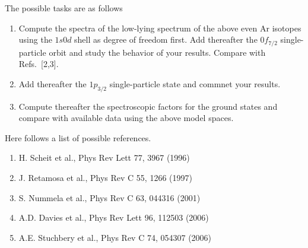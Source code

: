 \documentclass[prc]{revtex4}
\begin{document}
The possible tasks are as follows
\begin{enumerate}
\item Compute the spectra  of the low-lying spectrum of the above even Ar isotopes using the $1s0d$ shell as degree of freedom first. Add thereafter the $0f_{7/2}$ single-particle orbit and study the behavior of your results. Compare with Refs.~[2,3]. 
\item Add thereafter the $1p_{3/2}$ single-particle state and commnet your results.
\item Compute thereafter the spectroscopic factors for the ground states
and compare with available data using the above model spaces. 
\end{enumerate}



Here follows a list of possible references.

\begin{enumerate}
\item  H. Scheit et al., Phys Rev Lett 77, 3967 (1996) 
\item  J. Retamosa et al., Phys Rev C 55, 1266 (1997) 
\item  S. Nummela et al., Phys Rev C 63, 044316 (2001) 
\item A.D. Davies et al., Phys Rev Lett 96, 112503 (2006)
\item  A.E. Stuchbery et al., Phys Rev C 74, 054307 (2006)
\end{enumerate}
\end{document}
